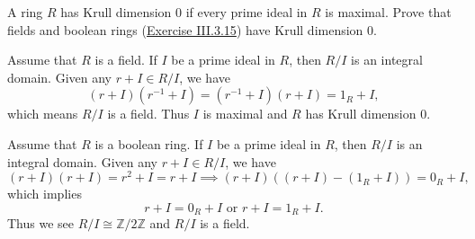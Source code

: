 \documentclass[12pt,letterpaper,boxed]{hmcpset}
\begin{document}
\begin{problem}[4.23]
A ring $R$ has Krull dimension 0 if every prime ideal in $R$ is maximal. Prove that fields and boolean rings (\hyperlink{Exercise III.3.15}{Exercise III.3.15}) have Krull dimension $0 .$
\end{problem}
\begin{solution}
Assume that $R$ is a field. If $I$ be a prime ideal in $R$, then $R/I$ is an integral domain. Given any $r+I\in R/I$, we have
\[
(r+I)(r^{-1}+I)=(r^{-1}+I)(r+I)=1_R+I,
\]
which means $R/I$ is a field. Thus $I$ is maximal and $R$ has Krull dimension $0$.

Assume that $R$ is a boolean ring. If $I$ be a prime ideal in $R$, then $R/I$ is an integral domain. Given any $r+I\in R/I$, we have
\[
(r+I)(r+I)=r^2+I=r+I\implies (r+I)\left((r+I)-(1_R+I)\right)=0_R+I,
\]
which implies
\[
r+I=0_R+I\text{  or  }r+I=1_R+I.
\]
Thus we see $R/I\cong \mathbb{Z}/2\mathbb{Z}$ and $R/I$ is a field.
\end{solution}
\end{document}
